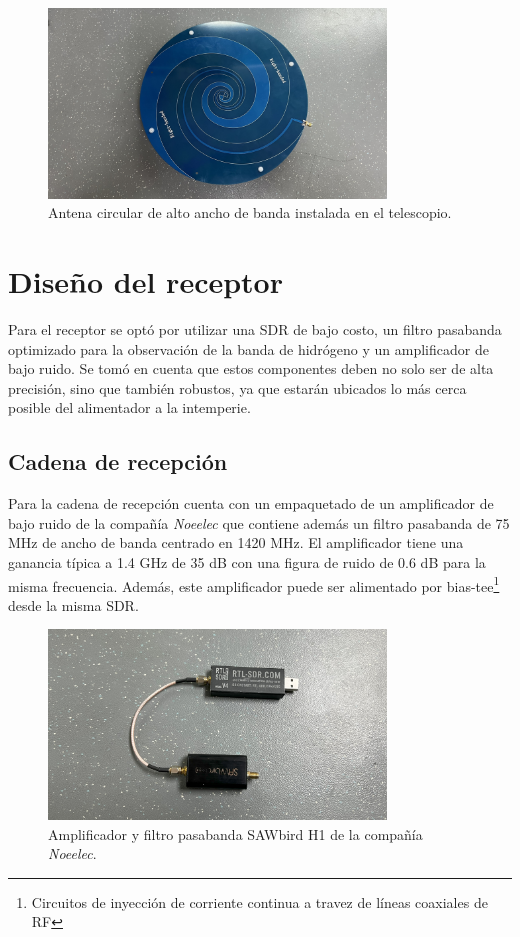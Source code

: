 \begin{figure}
    \centering
    \includegraphics[width=0.8\textwidth]{img/paletaFeed}
    \caption{Antena circular de alto ancho de banda instalada en el telescopio.}
    \label{fig:ensamble15}
\end{figure}


\section{Diseño del receptor}

Para el receptor se optó por utilizar una SDR de bajo costo, un filtro pasabanda optimizado para la observación de la banda de hidrógeno y un amplificador de bajo ruido. Se tomó en cuenta que estos componentes deben no solo ser de alta precisión, sino que también robustos, ya que estarán ubicados lo más cerca posible del alimentador a la intemperie.\\

\subsection{Cadena de recepción}

Para la cadena de recepción cuenta con un empaquetado de un amplificador de bajo ruido de la compañía \textit{Noeelec} que contiene además un filtro pasabanda de 75 MHz de ancho de banda centrado en 1420 MHz. El amplificador tiene una ganancia típica a 1.4 GHz de 35 dB con una figura de ruido de 0.6 dB para la misma frecuencia. Además, este amplificador puede ser alimentado por bias-tee\footnote{Circuitos de inyección de corriente continua a travez de líneas coaxiales de RF} desde la misma SDR.\\

\begin{figure}
    \centering
    \includegraphics[width=0.8\textwidth]{img/rtl_saw}
    \caption{Amplificador y filtro pasabanda SAWbird H1 de la compañía \textit{Noeelec}.}
    \label{fig:cadena}
\end{figure}

